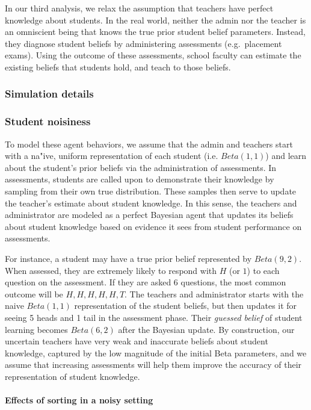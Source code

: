 \documentclass[man]{apa6}
\begin{document}
In our third analysis, we relax the assumption that teachers have
perfect knowledge about students. In the real world, neither the admin
nor the teacher is an omniscient being that knows the true prior student
belief parameters. Instead, they diagnose student beliefs by
administering assessments (e.g.~placement exams). Using the outcome of
these assessments, school faculty can estimate the existing beliefs that
students hold, and teach to those beliefs.

\subsubsection{Simulation details}\label{simulation-details-1}

\subsubsection{Student noisiness}\label{student-noisiness}

To model these agent behaviors, we assume that the admin and teachers
start with a na"ive, uniform representation of each student (i.e.
\(Beta(1,1)\)) and learn about the student's prior beliefs via the
administration of assessments. In assessments, students are called upon
to demonstrate their knowledge by sampling from their own true
distribution. These samples then serve to update the teacher's estimate
about student knowledge. In this sense, the teachers and administrator
are modeled as a perfect Bayesian agent that updates its beliefs about
student knowledge based on evidence it sees from student performance on
assessments.

For instance, a student may have a true prior belief represented by
\(Beta(9,2)\). When assessed, they are extremely likely to respond with
\(H\) (or \(1\)) to each question on the assessment. If they are asked 6
questions, the most common outcome will be \({H, H, H, H, H, T}\). The
teachers and administrator starts with the naive \(Beta(1,1)\)
representation of the student beliefs, but then updates it for seeing 5
heads and 1 tail in the assessment phase. Their \emph{guessed belief} of
student learning becomes \(Beta(6,2)\) after the Bayesian update. By
construction, our uncertain teachers have very weak and inaccurate
beliefs about student knowledge, captured by the low magnitude of the
initial Beta parameters, and we assume that increasing assessments will
help them improve the accuracy of their representation of student
knowledge.

\paragraph{Effects of sorting in a noisy
setting}\label{effects-of-sorting-in-a-noisy-setting}
\end{document}
